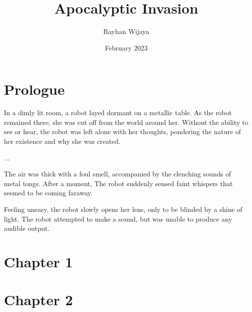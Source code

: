 \documentclass[12pt]{book}
\title{Apocalyptic Invasion}
\author{Rayhan Wijaya}
\date{February 2023}
\begin{document}
\maketitle

\section*{Prologue}

In a dimly lit room, a robot layed dormant on a metallic table. As the
robot remained there, she was cut off from the world around her.
Without the ability to see or hear, the robot was left alone with her
thoughts, pondering the nature of her existence and why she was
created.

...

The air was thick with a foul smell, accompanied by the clenching sounds of
metal tongs. After a moment, The robot suddenly sensed faint whispers that
seemed to be coming faraway.

Feeling uneasy, the robot slowly opens her lens, only to be blinded by
a shine of light. The robot attempted to make a sound, but was unable
to produce any audible output.

\section*{Chapter 1}

\section*{Chapter 2}
\end{document}
